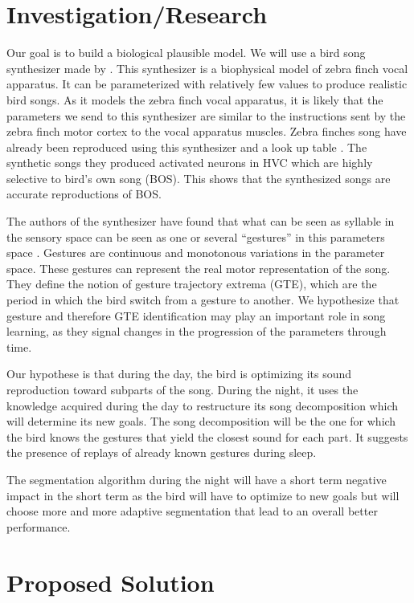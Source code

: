 \documentclass[a4paper]{article}
\begin{document}
\begin{multicols}{1}
\section*{Investigation/Research}

Our goal is to build a biological plausible model. We will use a bird song
synthesizer made by \textcite{boari_automatic_2015}. This synthesizer is a
biophysical model of zebra finch vocal apparatus. It can be parameterized with
relatively few values to produce realistic bird songs. As it models the zebra
finch vocal apparatus, it is likely that the parameters we send to this
synthesizer are similar to the instructions sent by the zebra finch motor cortex
to the vocal apparatus muscles. Zebra finches song have already been reproduced
using this synthesizer and a look up table \parencite{boari_automatic_2015}. The
synthetic songs they produced activated neurons in HVC which are highly
selective to bird's own song (BOS). This shows that the synthesized songs are
accurate reproductions of BOS.

The authors of the synthesizer have found that what can be seen as syllable in
the sensory space can be seen as one or several ``gestures'' in this parameters
space \parencite{amador_low_2014, boari_automatic_2015}. Gestures are continuous
and monotonous variations in the parameter space. These gestures can represent
the real motor representation of the song. They define the notion of gesture
trajectory extrema (GTE), which are the period in which the bird switch from a
gesture to another. We hypothesize that gesture and therefore GTE identification
may play an important role in song learning, as they signal changes in the
progression of the parameters through time.

Our hypothese is that during the day, the bird is optimizing its sound
reproduction toward subparts of the song. During the night, it uses the
knowledge acquired during the day to restructure its song decomposition which
will determine its new goals. The song decomposition will be the one for which
the bird knows the gestures that yield the closest sound for each part. It
suggests the presence of replays of already known gestures during sleep.

The segmentation algorithm during the night will have a short term negative
impact in the short term as the bird will have to optimize to new goals but will
choose more and more adaptive segmentation that lead to an overall better
performance.

\section*{Proposed Solution}


\end{multicols}
\end{document}

